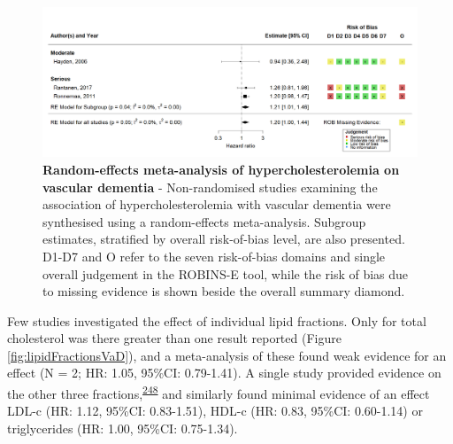 \documentclass[a4paper, twoside]{templates/ociamthesis}
\begin{document}
\begin{figure}[H]
\includegraphics[width=1\linewidth]{figures/sys-rev/fp_obs_hyperchol_VaD} \caption[Random-effects meta-analysis of hypercholesterolemia on vascular dementia]{\textbf{Random-effects meta-analysis of hypercholesterolemia on vascular dementia} - Non-randomised studies examining the association of hypercholesterolemia with vascular dementia were synthesised using a random-effects meta-analysis. Subgroup estimates, stratified by overall risk-of-bias level, are also presented. D1-D7 and O refer to the seven risk-of-bias domains and single overall judgement in the ROBINS-E tool, while the risk of bias due to missing evidence is shown beside the overall summary diamond.}\label{fig:obsHyperVaD}
\end{figure}

Few studies investigated the effect of individual lipid fractions. Only for total cholesterol was there greater than one result reported (Figure \ref{fig:lipidFractionsVaD}), and a meta-analysis of these found weak evidence for an effect (N = 2; HR: 1.05, 95\%CI: 0.79-1.41). A single study provided evidence on the other three fractions,\textsuperscript{\protect\hyperlink{ref-yoshitake1995}{248}} and similarly found minimal evidence of an effect LDL-c (HR: 1.12, 95\%CI: 0.83-1.51), HDL-c (HR: 0.83, 95\%CI: 0.60-1.14) or triglycerides (HR: 1.00, 95\%CI: 0.75-1.34).
\end{document}
